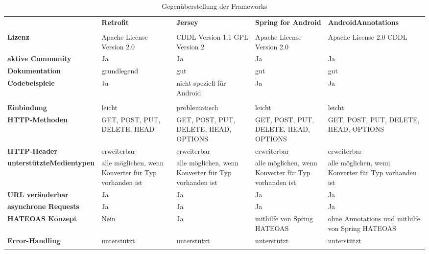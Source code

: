 \begin{landscape}
\renewcommand{\arraystretch}{1.3}
\begin{longtable}{m{3.5cm}|m{4.5cm}|m{4.5cm}|m{4.5cm}|m{4.5cm}}

      \caption{Gegenüberstellung der Frameworks} \\
	  \label{tableVergleich}	 
	  
	    & \textbf{Retrofit} & \textbf{Jersey} & \textbf{Spring for Android}  & \textbf{AndroidAnnotations}  \\  \hhline{=====}
	   \multicolumn{5}{c}{\textbf{Entwicklungskultur}} \\ \hhline{=====}
	  \textbf{Lizenz} &
	  Apache License Version 2.0 & CDDL Version 1.1 \newline GPL Version 2 & 
	  Apache License Version 2.0 & 
	  Apache License 2.0 \newline CDDL \\ \hline
	  \textbf{aktive Community} & Ja & Ja & Ja & Ja\\ \hline
	  \textbf{Dokumentation} & grundlegend & gut & gut  & gut \\ \hline 
		  \textbf{Codebeispiele} &  Ja  & nicht speziell für Android & Ja & Ja\\ \hhline{=====}
	  
	  \multicolumn{5}{c}{\textbf{Implementierung}} \\ \hhline{=====}
	  \textbf{Einbindung} & leicht & problematisch & leicht & leicht \\ \hline
	  \textbf{HTTP-Methoden} & GET, POST, PUT, DELETE, HEAD & GET, POST, PUT, DELETE, HEAD, OPTIONS  & GET, POST, PUT, DELETE, HEAD, OPTIONS & GET, POST, PUT, DELETE, HEAD, OPTIONS \\ \hline
	  \textbf{HTTP-Header} & erweiterbar & erweiterbar & erweiterbar & erweiterbar \\ \hline
	  \textbf{unterstützte\newline Medientypen} & alle möglichen, wenn Konverter für Typ vorhanden ist & alle möglichen, wenn Konverter für Typ vorhanden ist & alle möglichen, wenn Konverter für Typ vorhanden ist & alle möglichen, wenn Konverter für Typ vorhanden ist \\ \hline
	  \textbf{URL veränderbar} & Ja & Ja & Ja & Ja  \\ \hline
	  \textbf{asynchrone Requests} & Ja & Ja & Ja & Ja \\ \hline
	  \textbf{HATEOAS Konzept} & Nein & Ja & mithilfe von Spring HATEOAS & ohne Annotations und mithilfe von Spring HATEOAS \\ \hline 
	  \textbf{Error-Handling} & unterstützt & unterstützt & unterstützt & unterstützt \\ \hline
	 \newpage \hhline{=====}
	  

\end{longtable}
\end{landscape}
